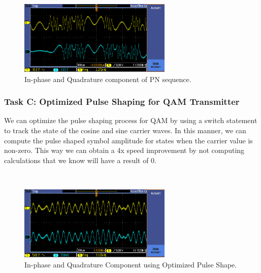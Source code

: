 \documentclass{article}
\begin{document}
\\
\pagebreak
\begin{figure}[h]
  \begin{center}
    \includegraphics[width=0.65\textwidth]{img/task_b_oscilloscope.png}
    \caption{In-phase and Quadrature component of PN sequence.}
  \end{center}
\end{figure}

\subsubsection{Task C: Optimized Pulse Shaping for QAM Transmitter}
We can optimize the pulse shaping process for QAM by using a switch statement to track the state of the cosine and sine carrier waves. In this manner, we can compute the pulse shaped symbol amplitude for states when the carrier value is non-zero. This way we can obtain a 4x speed improvement by not computing calculations that we know will have a result of 0.

\\

\begin{figure}[h]
  \begin{center}
    \includegraphics[width=0.65\textwidth]{img/task_c_oscilloscope.png}
    \caption{In-phase and Quadrature Component using Optimized Pulse Shape.}
  \end{center}
\end{figure}
\end{document}
